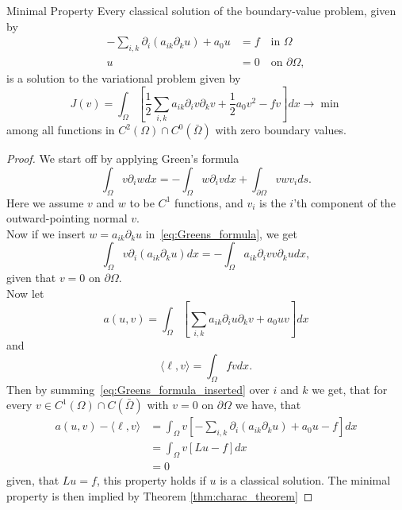 \begin{thmx}{Minimal Property}
    Every classical solution of the boundary-value problem, given by
\begin{align}
    -\sum_{i,k} \partial_i (a_{ik}\partial_k u) + a_0 u &= f \quad \text{in } \Omega  \\
    u &= 0 \quad \text{on } \partial \Omega,
\end{align}
    is a solution to the variational problem given by
    \[
        J(v)=\int_\Omega [\frac{1}{2}\sum_{i,k} a_{ik} \partial_i v\partial_k v + \frac{1}{2} a_0 v^2 -fv]dx \longrightarrow \min
    \]
    among all functions in $C^2(\Omega)\cap C^0(\bar{\Omega})$ with zero boundary values. 
\end{thmx}
\begin{proof}
    We start off by applying Green's formula
    \[
    \label{eq:Greens_formula}
        \int_\Omega v\partial_i w dx = -\int_\Omega w \partial_i v dx + \int_{\partial \Omega} v w v_i ds.
    \]
    Here we assume $v$ and $w$ to be $C^1$ functions, and $v_i$ is the $i$'th component of the outward-pointing normal $v$.
    \\
    Now if we insert $w=a_{ik}\partial_k u$ in~\eqref{eq:Greens_formula}, we get
    \[
    \label{eq:Greens_formula_inserted}
        \int_\Omega v\partial_i (a_{ik} \partial_k u) dx = -\int_\Omega a_{ik} \partial_i v v\partial_k u dx,
    \]  
    given that $v=0$ on $\partial \Omega$.
    \\
    Now let 
    \begin{equation}
    \label{eq:a(u,v)}
        a(u,v) = \int_\Omega \left[\sum_{i,k} a_{ik} \partial_i u \partial_k v +a_0 uv \right]dx
    \end{equation}
    and
    \begin{equation}
    \label{eq:l(v)}
        \langle \ell,v \rangle = \int_\Omega fv dx.
    \end{equation}
    Then by summing~\eqref{eq:Greens_formula_inserted} over $i$ and $k$ we get, that for every $v\in C^1(\Omega) \cap C(\bar{\Omega})$ with $v=0$ on $\partial \Omega$ we have, that 
    \begin{align*}
        a(u,v) - \langle \ell,v \rangle &= \int_\Omega v\left[ -\sum_{i,k} \partial_i (a_{ik} \partial_k u) + a_0 u - f \right] dx \\     
        &= \int_\Omega v [Lu - f] dx \\
        &= 0
    \end{align*}
    given, that $Lu = f$, this property holds if $u$ is a classical solution.
     The minimal property is then implied by Theorem \ref{thm:charac_theorem}
\end{proof}